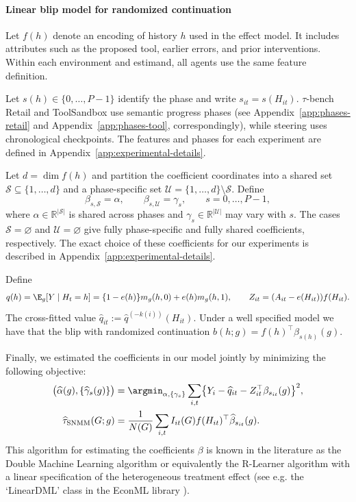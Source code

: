 \paragraph{Linear blip model for randomized continuation}
Let $f(h)$ denote an encoding of history $h$ used in the effect model. It includes
attributes such as the proposed tool, earlier errors, and prior interventions.
Within each environment and estimand, all agents use the same feature definition.

Let $s(h)\in\{0,\ldots,P-1\}$ identify the phase and write $s_{it}=s(H_{it})$.
$\tau$-bench Retail and ToolSandbox use semantic progress phases (see Appendix~\ref{app:phases-retail} and Appendix~\ref{app:phases-tool}, correspondingly), while steering uses
chronological checkpoints. The features and phases for each experiment are defined in
Appendix~\ref{app:experimental-details}.

Let $d=\dim f(h)$ and partition the coefficient coordinates into a shared set
$\mathcal S\subseteq\{1,\ldots,d\}$ and a phase-specific set
$\mathcal U=\{1,\ldots,d\}\setminus\mathcal S$. Define
\begin{equation}
 \beta_{s,\mathcal S}=\alpha,\qquad
 \beta_{s,\mathcal U}=\gamma_s,\qquad s=0,\ldots,P-1,
 \label{eq:coefficient-sharing}
\end{equation}
where $\alpha\in\mathbb R^{|\mathcal S|}$ is shared across phases and
$\gamma_s\in\mathbb R^{|\mathcal U|}$ may vary with $s$.  The cases $\mathcal S=\varnothing$ and $\mathcal U=\varnothing$
give fully phase-specific and fully shared coefficients, respectively. The exact choice of these coefficients for our experiments is described in Appendix~\ref{app:experimental-details}.

Define
\[
 q(h)=\E_g[Y\mid H_t=h]=\{1-e(h)\}m_g(h,0)+e(h)m_g(h,1),
 \qquad Z_{it}=(A_{it}-e(H_{it}))f(H_{it}).
\]
The cross-fitted value $\widehat q_{it}:=\widehat q^{(-k(i))}(H_{it})$.
Under a well specified model we have that the blip with randomized continuation $b(h;g)=f(h)^\top\beta_{s(h)}(g)$.

Finally, we estimated the coefficients in our model jointly by minimizing the following objective:
\begin{equation}
\begin{aligned}
 \bigl(\widehat\alpha(g),\{\widehat\gamma_s(g)\}\bigr)
   &=\argmin_{\alpha,\{\gamma_s\}}\sum_{i,t}
       \bigl\{Y_i-\widehat q_{it}-Z_{it}^\top\beta_{s_{it}}(g)\bigr\}^2,\\
 \widehat\tau_{\mathrm{SNMM}}(G;g)
   &=\frac{1}{N(G)}\sum_{i,t}I_{it}(G)f(H_{it})^\top\widehat\beta_{s_{it}}(g).
\end{aligned}
\label{eq:local-snmm}
\end{equation}
This algorithm for estimating the coefficients $\beta$ is known in the literature as the Double Machine Learning algorithm \cite{chernozhukov2018dml} or equivalently the R-Learner algorithm \cite{nie2021quasi} with a linear specification of the heterogeneous treatment effect (see e.g. the `LinearDML' class in the EconML library \cite{econml}). 


